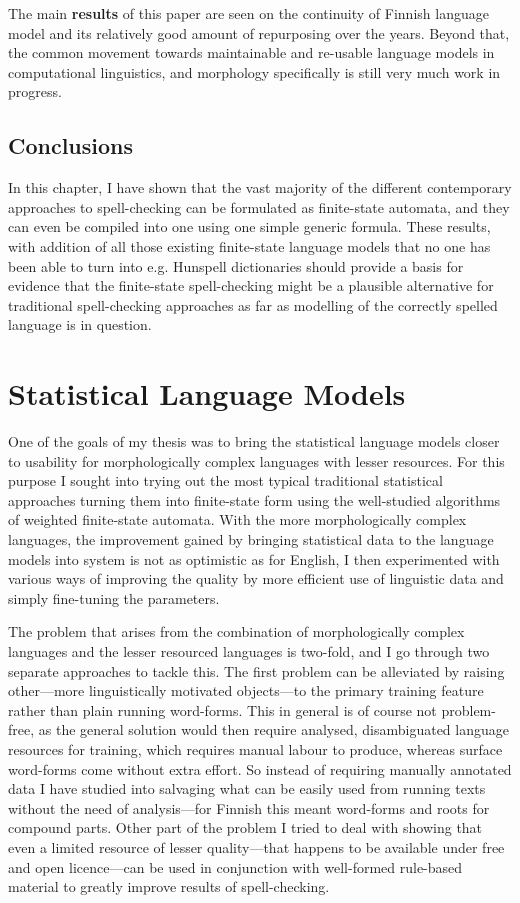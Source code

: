 \documentclass[officiallayout]{unihelcompling}
\begin{document}
The main \textbf{results} of this paper are seen on the continuity of Finnish
language model and its relatively good amount of repurposing over the years.
Beyond that, the common movement towards maintainable and re-usable language
models in computational linguistics, and morphology specifically is still very
much work in progress.

\section{Conclusions}

In this chapter, I have shown that the vast majority of the different
contemporary approaches to spell-checking can be formulated as finite-state
automata, and they can even be compiled into one using one simple generic
formula. These results, with addition of all those existing finite-state
language models that no one has been able to turn into e.g. Hunspell
dictionaries should provide a basis for evidence that the finite-state
spell-checking might be a plausible alternative for traditional spell-checking
approaches as far as modelling of the correctly spelled language is in
question.

\chapter{Statistical Language Models}
\label{chap:statistical-models}

One of the goals of my thesis was to bring the statistical language models
closer to usability for morphologically complex languages with lesser
resources. For this purpose I sought into trying out the most typical
traditional statistical approaches turning them into finite-state form
using the well-studied algorithms of weighted finite-state automata. With the
more morphologically complex languages, the improvement gained by bringing
statistical data to the language models into system is not as optimistic as
for English, I then experimented with various ways of improving the quality
by more efficient use of linguistic data and simply fine-tuning the parameters.

The problem that arises from the combination of morphologically complex
languages and the lesser resourced languages is two-fold, and I go through two
separate approaches to tackle this. The first problem can be alleviated by
raising other---more linguistically motivated objects---to the primary training
feature rather than plain running word-forms. This in general is of course not
problem-free, as the general solution would then require analysed,
disambiguated language resources for training, which requires manual labour to
produce, whereas surface word-forms come without extra effort. So instead of
requiring manually annotated data I have studied into salvaging what can be
easily used from running texts without the need of analysis---for Finnish
this meant word-forms and roots for compound parts. Other part of the problem I
tried to deal with showing that even a limited resource of lesser
quality---that happens to be available under free and open licence---can be
used in conjunction with well-formed rule-based material to greatly improve
results of spell-checking.
\end{document}
